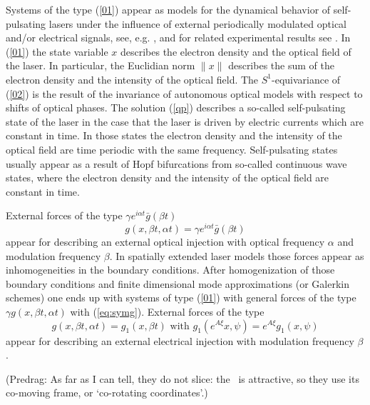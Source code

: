 \begin{description}
Systems of the type (\ref{01}) appear as models for the dynamical
behavior of self-pulsating lasers under the influence of external
periodically modulated optical and/or electrical signals, see, e.g.
\cite{Radziunas2006,Bandelow1998,Lichtner2007,Nizette2001,Peterhof1999,Sieber2002,Wieczorek2005},
and for related experimental results see \cite{Feiste1994,Sartorius1998}.
In (\ref{01}) the state variable $x$ describes the electron density
and the optical field of the laser. In particular, the Euclidian norm
$\|x\|$ describes the sum of the electron density and the intensity
of the optical field. The $S^{1}$-equivariance of (\ref{02}) is
the result of the invariance of autonomous optical models with respect
to shifts of optical phases. The solution (\ref{qp}) describes a
so-called self-pulsating state of the laser in the case that the laser
is driven by electric currents which are constant in time. In those
states the electron density and the intensity of the optical field
are time periodic with the same frequency. Self-pulsating states usually
appear as a result of Hopf bifurcations from so-called continuous
wave states, where the electron density and the intensity of the optical
field are constant in time.

External forces of the type $\gamma e^{i\alpha t}\bar{g}(\beta t)$
\[
g(x,\beta t,\alpha t)=\gamma e^{i\alpha t}\bar{g}(\beta t)
\]
appear for describing an external optical injection with optical frequency
$\alpha$ and modulation frequency $\beta$. In spatially extended
laser models those forces appear as inhomogeneities in the boundary
conditions. After homogenization of those boundary conditions and
finite dimensional mode approximations (or Galerkin schemes) one ends
up with systems of type (\ref{01}) with general forces of the type
$\gamma g(x,\beta t,\alpha t)$ with (\ref{eq:symg}). External forces
of the type \[
g(x,\beta t,\alpha t)=g_{1}(x,\beta t)\mbox{ with }g_{1}(e^{A\xi}x,\psi)=e^{A\xi}g_{1}(x,\psi)\]
 appear for describing an external electrical injection with modulation
frequency $\beta$.

(Predrag:
As far as I can tell, they do not slice: the \rpo\ is attractive, so they use its
co-moving frame, or `co-rotating coordinates'.)


\end{description}
